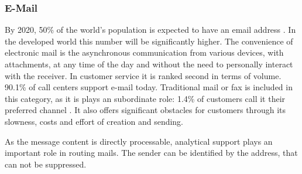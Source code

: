 		\subsubsection{E-Mail}
		
		By 2020, 50\% of the world's population is expected to have an email address \citep{radial2016}. In the developed world this number will be significantly higher. The convenience of electronic mail is the asynchronous communication from various devices, with attachments, at any time of the day and without the need to personally interact with the receiver. In customer service it is ranked second in terms of volume. 90.1\% of call centers support e-mail \citep{dimensiondata2016} today. Traditional mail or fax is included in this category, as it is plays an subordinate role: 1.4\% of customers call it their preferred channel \citep{ocm2015}. It also offers significant obstacles for customers through its slowness, costs and effort of creation and sending. 
		
		As the message content is directly processable, analytical support plays an important role in routing mails. The sender can be identified by the address, that can not be suppressed. 
		
